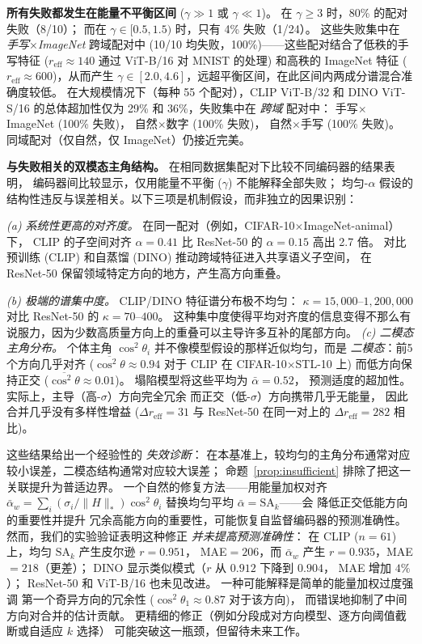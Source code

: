 \documentclass{article}
\newcommand{\reff}{\ensuremath{r_{\mathrm{eff}}}\xspace}
\newcommand{\SAk}{\ensuremath{\mathrm{SA}_k}\xspace}
\begin{document}
\textbf{所有失败都发生在能量不平衡区间} ($\gamma\gg1$ 或 $\gamma\ll1$)。
在 $\gamma\geq3$ 时，80\% 的配对失败（8/10）；
而在 $\gamma\in[0.5,1.5)$ 时，只有 4\% 失败（1/24）。
这些失败集中在 \emph{手写$\times$ImageNet} 跨域配对中
(10/10 均失败，100\%)——这些配对结合了低秩的手写特征
($\reff{\approx}140$ 通过 ViT-B/16 对 MNIST 的处理) 和高秩的 ImageNet 特征
($\reff{\approx}600$)，从而产生 $\gamma\in[2.0,4.6]$，远超平衡区间，在此区间内两成分谱混合准确度较低。
在大规模情况下（每种 55 个配对），CLIP ViT-B/32 和 DINO ViT-S/16 的总体超加性仅为 29\% 和 36\%，失败集中在 \emph{跨域} 配对中：
手写$\times$ImageNet (100\% 失败)，
自然$\times$数字 (100\% 失败)，
自然$\times$手写 (100\% 失败)。
同域配对（仅自然，仅 ImageNet）仍接近完美。

\textbf{与失败相关的双模态主角结构。}
在相同数据集配对下比较不同编码器的结果表明，
编码器间比较显示，仅用能量不平衡 ($\gamma$) 不能解释全部失败；
均匀-$\alpha$ 假设的结构性违反与误差相关。以下三项是机制假设，而非独立的因果识别：

\emph{(a) 系统性更高的对齐度。}
在同一配对（例如，CIFAR-10$\times$ImageNet-animal）下，
CLIP 的子空间对齐 $\alpha{=}0.41$ 比 ResNet-50 的 $\alpha{=}0.15$ 高出 2.7 倍。
对比预训练 (CLIP) 和自蒸馏 (DINO) 推动跨域特征进入共享语义子空间，
在 ResNet-50 保留领域特定方向的地方，产生高方向重叠。

\emph{(b) 极端的谱集中度。}
CLIP/DINO 特征谱分布极不均匀：
$\kappa{=}15{,}000$--$1{,}200{,}000$ 对比 ResNet-50 的 $\kappa{=}70$--$400$。
这种集中度使得平均对齐度的信息变得不那么有说服力，因为少数高质量方向上的重叠可以主导许多互补的尾部方向。
\emph{(c) 二模态主角分布。}
个体主角 $\cos^2\theta_i$
并不像模型假设的那样近似均匀，而是 \emph{二模态}：前5个方向几乎对齐
($\overline{\cos^2\theta}\approx0.94$ 对于 CLIP 在 CIFAR-10$\times$STL-10 上)
而低方向保持正交
($\overline{\cos^2\theta}\approx0.01$)。
塌陷模型将这些平均为 $\bar\alpha{=}0.52$，
预测适度的超加性。
实际上，主导（高-$\sigma$）方向完全冗余
而正交（低-$\sigma$）方向携带几乎无能量，
因此合并几乎没有多样性增益 ($\Delta r_{\mathrm{eff}}{=}31$
与 ResNet-50 在同一对上的 $\Delta r_{\mathrm{eff}}{=}282$ 相比)。

这些结果给出一个经验性的 \emph{失效诊断}：
在本基准上，较均匀的主角分布通常对应较小误差，二模态结构通常对应较大误差；
命题~\ref{prop:insufficient} 排除了把这一关联提升为普适边界。
一个自然的修复方法——用能量加权对齐
$\bar\alpha_w=\sum_i({\sigma_i}/{\|H\|_*})\cos^2\theta_i$
替换均匀平均 $\bar\alpha=\SAk$——会
降低正交低能方向的重要性并提升
冗余高能方向的重要性，可能恢复自监督编码器的预测准确性。
然而，我们的实验验证表明这种修正
\emph{并未提高预测准确性}：
在 CLIP ($n{=}61$) 上，均匀 $\SAk$ 产生皮尔逊 $r{=}0.951$，
MAE${=}206$，而 $\bar\alpha_w$ 产生 $r{=}0.935$，MAE${=}218$（更差）；
DINO 显示类似模式（$r$ 从 $0.912$ 下降到 $0.904$，
MAE 增加 $4\%$）；
ResNet-50 和 ViT-B/16 也未见改进。
一种可能解释是简单的能量加权过度强调
第一个奇异方向的冗余性
($\cos^2\theta_1{\approx}0.87$ 对于该方向)，
而错误地抑制了中间方向对合并的估计贡献。
更精细的修正（例如分段成对方向模型、逐方向阈值截断或自适应 $k$ 选择）
可能突破这一瓶颈，但留待未来工作。
\end{document}
